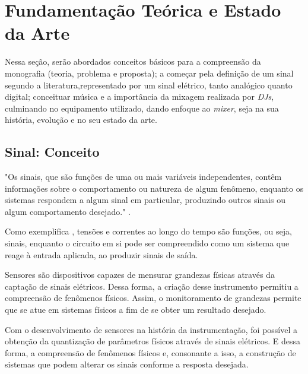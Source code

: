 \chapter[Fundamentação Teórica e Estado da Arte]{Fundamentação Teórica e Estado da Arte}
\label{cha:fundamentacao}
Nessa seção, serão abordados conceitos básicos para a compreensão da monografia (teoria, problema e proposta); a começar pela definição de um sinal segundo a literatura,representado por um sinal elétrico, tanto analógico quanto digital; conceituar música e a importância da mixagem realizada por \textit{DJs}, culminando no equipamento utilizado, dando enfoque ao \textit{mixer}, seja na sua história, evolução e no seu estado da arte.


\newpage
\section{Sinal: Conceito}

\begin{citacao}
"Os sinais, que são funções de uma ou mais variáveis independentes, contêm informações sobre o comportamento ou natureza de algum fenômeno, enquanto os sistemas respondem a algum sinal em particular, produzindo outros sinais ou algum comportamento desejado." \cite{oppenheim2010sinais}.
\end{citacao}

Como exemplifica \cite{oppenheim2010sinais}, tensões e correntes ao longo do tempo são funções, ou seja, sinais, enquanto o circuito em si pode ser compreendido como um sistema que reage à entrada aplicada, ao produzir sinais de saída.

Sensores são dispositivos capazes de mensurar grandezas físicas através da captação de sinais elétricos. Dessa forma, a criação desse instrumento permitiu a compreensão de fenômenos físicos. Assim, o monitoramento de grandezas permite que se atue em sistemas físicos a fim de se obter um resultado desejado.

Com o desenvolvimento de sensores na história da instrumentação, foi possível a obtenção da quantização de parâmetros físicos através de sinais elétricos. E dessa forma, a compreensão de fenômenos físicos e, consonante a isso, a construção de sistemas que podem alterar os sinais conforme a resposta desejada. 

